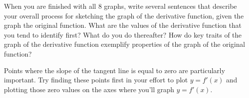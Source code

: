 \begin{activity}
\begin{center}
\centerline{\hspace{4in}}
\end{center}

When you are finished with all 8 graphs, write several sentences that describe your overall process for sketching the graph of the derivative function, given the graph the original function.  What are the values of the derivative function that you tend to identify first?  What do you do thereafter?  How do key traits of the graph of the derivative function exemplify properties of the graph of the original function?

\end{activity}
\begin{smallhint}
Points where the slope of the tangent line is equal to zero are particularly important.  Try finding these points first in your effort to plot $y = f'(x)$ and plotting those zero values on the axes where you'll graph $y = f'(x)$.  
\end{smallhint}
